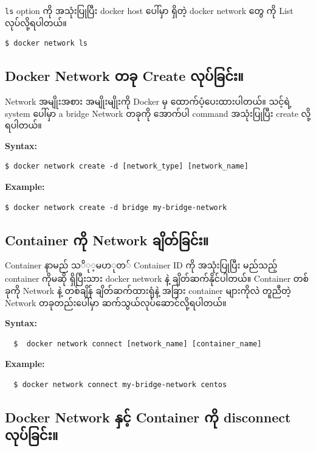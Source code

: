 \texttt{ls} option ကို အသုံးပြုပြီး docker host ပေါ်မှာ ရှိတဲ့ docker
network တွေ ကို List လုပ်လို့ရပါတယ်။

\begin{verbatim}
$ docker network ls
\end{verbatim}

\subsection{Docker Network တခု Create
လုပ်ခြင်း။}\label{docker-network--create-}

Network အမျိုးအစား အမျိုးမျိုးကို Docker မှ ထောက်ပံ့ပေးထားပါတယ်။ သင့်ရဲ့
system ပေါ်မှာ a bridge Network တခုကို အောက်ပါ command အသုံးပြုပြီး
create လို့ရပါတယ်။

\textbf{Syntax:}

\begin{verbatim}
$ docker network create -d [network_type] [network_name]
\end{verbatim}

\textbf{Example:}

\begin{verbatim}
$ docker network create -d bridge my-bridge-network
\end{verbatim}

\subsection{Container ကို Network
ချိတ်ခြင်း။}\label{container--network-}

Container နာမည် $သို့မဟုတ်$ Container ID ကို အသုံးပြုပြီး မည်သည့်
container ကိုမဆို ရှိပြီးသား docker network နဲ့ ချိတ်ဆက်နိုင်ပါတယ်။
Container တစ်ခုကို Network နဲ့ တစ်ချိန် ချိတ်ဆက်ထားရုံနဲ့ အခြား
container များကိုလဲ တူညီတဲ့ Network တခုတည်းပေါ်မှာ
ဆက်သွယ်လုပ်ဆောင်လို့ရပါတယ်။

\textbf{Syntax:}

\begin{verbatim}
  $  docker network connect [network_name] [container_name]
\end{verbatim}

\textbf{Example:}

\begin{verbatim}
  $ docker network connect my-bridge-network centos
\end{verbatim}

\subsection{Docker Network နှင့် Container ကို disconnect
လုပ်ခြင်း။}\label{docker-network--container--disconnect-}

